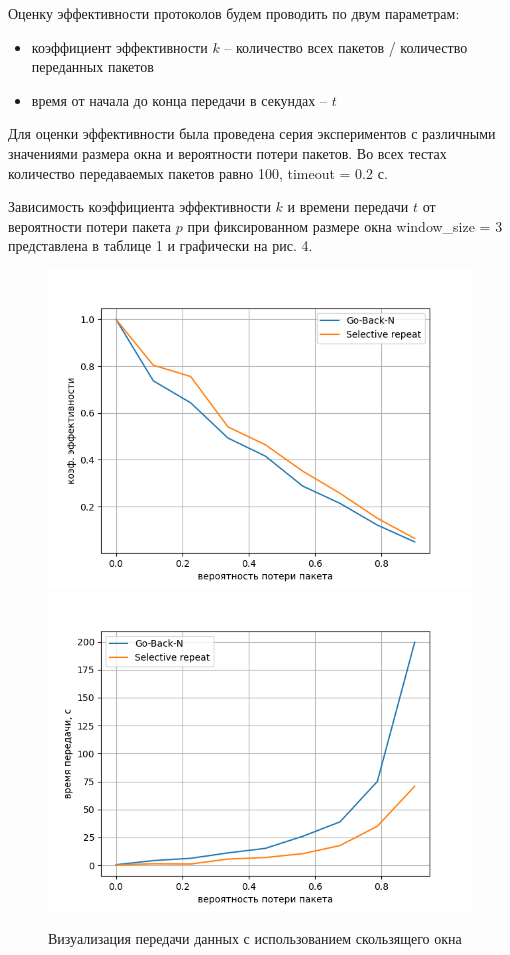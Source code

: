 Оценку эффективности протоколов будем проводить по двум
параметрам:

\begin{itemize}
	\item коэффициент эффективности $k$ -- количество всех пакетов / количество переданных пакетов
	\item время от начала до конца передачи в секундах – $t$
\end{itemize}

Для оценки эффективности была проведена серия экспериментов с
различными значениями размера окна и вероятности потери пакетов. Во всех
тестах количество передаваемых пакетов равно 100, timeout = 0.2 с.

Зависимость коэффициента эффективности $k$ и времени передачи $t$ от
вероятности потери пакета $p$ при фиксированном размере окна
window\_size = 3 представлена в таблице 1 и графически на рис. 4.

\begin{figure}[H]
	\begin{center}
		\includegraphics[scale=0.5]{fig1}
		\includegraphics[scale=0.5]{fig2}
		\caption{Визуализация передачи данных с использованием скользящего окна}
	\end{center}
\end{figure}

